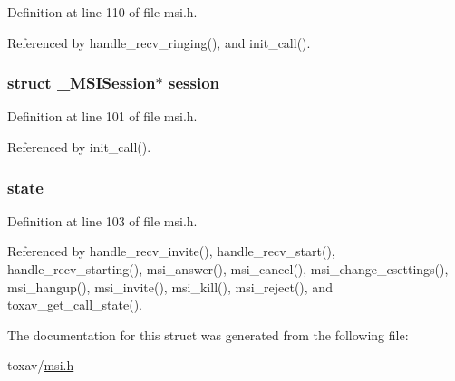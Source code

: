 Definition at line 110 of file msi.\+h.



Referenced by handle\+\_\+recv\+\_\+ringing(), and init\+\_\+call().

\hypertarget{struct___m_s_i_call_ab8c2a41964c26c7f08f62fa440541b12}{
\subsubsection[{session}]{\setlength{\rightskip}{0pt plus 5cm}struct {\bf \+\_\+\+M\+S\+I\+Session}$\ast$ session}}\label{struct___m_s_i_call_ab8c2a41964c26c7f08f62fa440541b12}


Definition at line 101 of file msi.\+h.



Referenced by init\+\_\+call().

\hypertarget{struct___m_s_i_call_a4a1fc0e5d23dbdc357786d4c69eda9b9}{
\subsubsection[{state}]{ state}}\label{struct___m_s_i_call_a4a1fc0e5d23dbdc357786d4c69eda9b9}


Definition at line 103 of file msi.\+h.



Referenced by handle\+\_\+recv\+\_\+invite(), handle\+\_\+recv\+\_\+start(), handle\+\_\+recv\+\_\+starting(), msi\+\_\+answer(), msi\+\_\+cancel(), msi\+\_\+change\+\_\+csettings(), msi\+\_\+hangup(), msi\+\_\+invite(), msi\+\_\+kill(), msi\+\_\+reject(), and toxav\+\_\+get\+\_\+call\+\_\+state().



The documentation for this struct was generated from the following file\+:\begin{DoxyCompactItemize}
\item 
toxav/\hyperlink{msi_8h}{msi.\+h}\end{DoxyCompactItemize}
